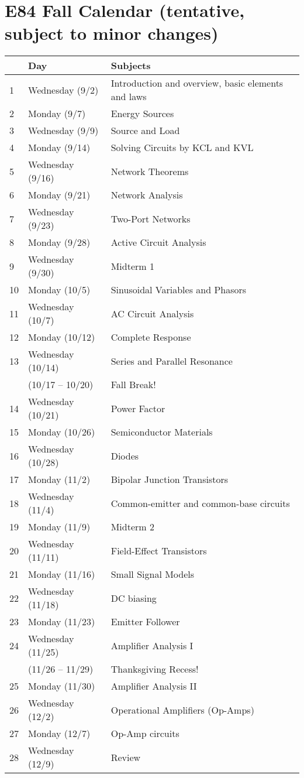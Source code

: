 \usepackage{html}
\textwidth 6.0in
\topmargin -0.5in
\oddsidemargin -0in
\evensidemargin -0.5in


\section*{E84 Fall Calendar (tentative, subject to minor changes)}

\begin{tabular}{l|l|l}\hline
  & {\bf Day} & {\bf Subjects} \\ \hline
1 & Wednesday (9/2) & Introduction and overview, basic elements and laws \\
2 & Monday (9/7) & Energy Sources \\
3 & Wednesday (9/9) & Source and Load \\
4 & Monday (9/14) & Solving Circuits by KCL and KVL \\
5 & Wednesday (9/16) & Network Theorems \\
6 & Monday (9/21) & Network Analysis \\
7 & Wednesday (9/23) & Two-Port Networks  \\
8 & Monday (9/28) & Active Circuit Analysis \\
9 & Wednesday (9/30) & Midterm 1 \\
10& Monday (10/5) & Sinusoidal Variables and Phasors \\
11& Wednesday (10/7) & AC Circuit Analysis \\
12& Monday (10/12) & Complete Response \\
13& Wednesday (10/14) & Series and Parallel Resonance \\
  & (10/17 -- 10/20) & Fall Break! \\
14& Wednesday (10/21) & Power Factor \\
15& Monday (10/26) & Semiconductor Materials \\
16& Wednesday (10/28) & Diodes \\ 
17& Monday (11/2) & Bipolar Junction Transistors \\
18& Wednesday (11/4) & Common-emitter and common-base circuits\\
19& Monday (11/9) & Midterm 2 \\
20& Wednesday (11/11) & Field-Effect Transistors \\
21& Monday (11/16) & Small Signal Models \\
22& Wednesday (11/18) & DC biasing \\ 
23& Monday (11/23) & Emitter Follower \\
24& Wednesday (11/25) & Amplifier Analysis I \\
  & (11/26 -- 11/29) & Thanksgiving Recess! \\
25& Monday (11/30) & Amplifier Analysis II \\
26& Wednesday (12/2) & Operational Amplifiers (Op-Amps)\\
27& Monday (12/7) & Op-Amp circuits \\
28& Wednesday (12/9) & Review \\
\end{tabular}



